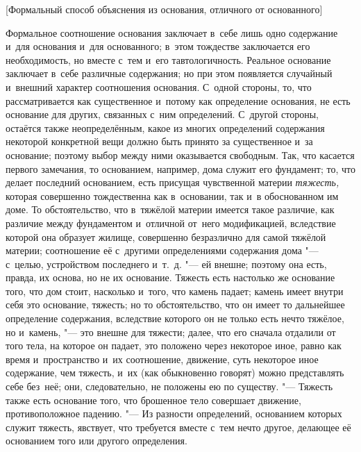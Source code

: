 %
{[Формальный способ объяснения из основания, отличного от основанного]}

Формальное соотношение основания заключает в~себе лишь одно содержание и~для
основания и~для основанного; в~этом тождестве заключается его необходимость,
но вместе с~тем и~его тавтологичность. Реальное основание заключает в~себе
различные содержания; но при этом появляется случайный и~внешний характер
соотношения основания. С~одной стороны, то, что рассматривается как
существенное и~потому как определение основания, не есть основание для других,
связанных с~ним определений. С~другой стороны, остаётся также неопределённым,
какое из многих определений содержания некоторой конкретной вещи должно быть
принято за существенное и~за основание; поэтому выбор между ними оказывается
свободным. Так, что касается первого замечания, то основанием, например, дома
служит его фундамент; то, что делает последний основанием, есть присущая
чувственной материи {\em тяжесть,} которая совершенно тождественна как
в~основании, так и~в обоснованном им доме. То обстоятельство, что в~тяжёлой
материи имеется такое различие, как различие между фундаментом и~отличной
от~него модификацией, вследствие которой она образует жилище, совершенно
безразлично для самой тяжёлой материи; соотношение её с~другими определениями
содержания дома "--- с~целью, устройством последнего и~т.~д. "--- ей внешне;
поэтому она есть, правда, их основа, но не их основание. Тяжесть есть настолько
же основание того, что дом стоит, насколько и~того, что камень падает; камень
имеет внутри себя это основание, тяжесть; но то обстоятельство, что он имеет то
дальнейшее определение содержания, вследствие которого он не только есть нечто
тяжёлое, но и~камень, "--- это внешне для тяжести; далее, что его сначала
отдалили от того тела, на которое он падает, это положено через некоторое
иное, равно как время и~пространство и~их соотношение, движение, суть
некоторое иное содержание, чем тяжесть, и~их (как обыкновенно говорят) можно
представлять себе без~неё; они, следовательно, не положены ею по существу. "---
Тяжесть также есть основание того, что брошенное тело совершает движение,
противоположное падению. "--- Из разности определений, основанием которых
служит тяжесть, явствует, что требуется вместе с~тем нечто другое, делающее
её основанием того или другого определения.

